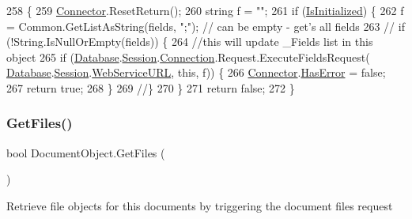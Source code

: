 \begin{DoxyCode}
258                                         \{
259         \mbox{\hyperlink{class_connector}{Connector}}.ResetReturn();
260         \textcolor{keywordtype}{string} f = \textcolor{stringliteral}{""};
261         \textcolor{keywordflow}{if} (\mbox{\hyperlink{class_document_object_a3b2075b73f38d05091b69decc6ce7992}{IsInitialized}}) \{
262             f = Common.GetListAsString(fields, \textcolor{stringliteral}{";"}); \textcolor{comment}{// can be empty - get's all fields}
263             \textcolor{comment}{// if (!String.IsNullOrEmpty(fields)) \{}
264             \textcolor{comment}{//this will update \_Fields list in this object}
265             \textcolor{keywordflow}{if} (\mbox{\hyperlink{class_document_object_a69d5338c9835f748490323d2950eed09}{Database}}.\mbox{\hyperlink{class_database_object_aa8484162b7d2a7c4c9426bca13c64c07}{Session}}.\mbox{\hyperlink{class_session_object_a014bdbf705a753540e19bfb53030c55c}{Connection}}.Request.ExecuteFieldsRequest(
      \mbox{\hyperlink{class_document_object_a69d5338c9835f748490323d2950eed09}{Database}}.\mbox{\hyperlink{class_database_object_aa8484162b7d2a7c4c9426bca13c64c07}{Session}}.\mbox{\hyperlink{class_session_object_a697c071c812fbf7ad1166b896fb44c16}{WebServiceURL}}, \textcolor{keyword}{this}, f)) \{
266                 \mbox{\hyperlink{class_connector}{Connector}}.\mbox{\hyperlink{class_connector_a9365777a6b7b711b75bcfa6c4d53e989}{HasError}} = \textcolor{keyword}{false};
267                 \textcolor{keywordflow}{return} \textcolor{keyword}{true};
268             \}
269             \textcolor{comment}{//\}}
270         \}
271         \textcolor{keywordflow}{return} \textcolor{keyword}{false};
272     \}
\end{DoxyCode}
\mbox{\label{class_document_object_a2c8aee9450e8fdd1e84e8ff26d0950a1}} 
\subsubsection{\texorpdfstring{Get\+Files()}{GetFiles()}}
{\footnotesize\ttfamily bool Document\+Object.\+Get\+Files (\begin{DoxyParamCaption}{ }\end{DoxyParamCaption})}



Retrieve file objects for this documents by triggering the document files request 

